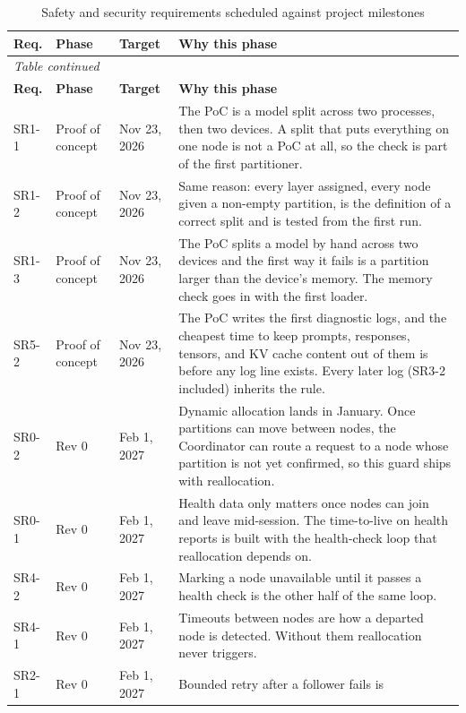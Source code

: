 \documentclass{article}
\begin{document}
\begin{longtable}{lp{2.1cm}p{1.9cm}>{\raggedright\arraybackslash}p{8.6cm}}
\caption{Safety and security requirements scheduled against project milestones}
\label{TblRoadmap}\\
\toprule
\textbf{Req.} & \textbf{Phase} & \textbf{Target} & \textbf{Why this phase}\\
\midrule
\endfirsthead
\multicolumn{4}{l}{\small\textit{Table \thetable{} continued}}\\
\toprule
\textbf{Req.} & \textbf{Phase} & \textbf{Target} & \textbf{Why this phase}\\
\midrule
\endhead
SR1-1 & Proof of concept & Nov 23, 2026 & The PoC is a model split across two
  processes, then two devices. A split that puts everything on one node is
  not a PoC at all, so the check is part of the first partitioner.\\
SR1-2 & Proof of concept & Nov 23, 2026 & Same reason: every layer assigned,
  every node given a non-empty partition, is the definition of a correct
  split and is tested from the first run.\\
SR1-3 & Proof of concept & Nov 23, 2026 & The PoC splits a model by hand
  across two devices and the first way it fails is a partition larger than the
  device's memory. The memory check goes in with the first loader.\\
SR5-2 & Proof of concept & Nov 23, 2026 & The PoC writes the first
  diagnostic logs, and the cheapest time to keep prompts, responses,
  tensors, and KV cache content out of them is before any log line exists.
  Every later log (SR3-2 included) inherits the rule.\\
\midrule
SR0-2 & Rev 0 & Feb 1, 2027 & Dynamic allocation lands in January.
  Once partitions can move between nodes, the
  Coordinator can route a request to a node whose partition is not yet
  confirmed, so this guard ships with
  reallocation.\\
SR0-1 & Rev 0 & Feb 1, 2027 & Health data only matters once nodes can
  join and leave mid-session. The time-to-live on health reports is built
  with the health-check loop that reallocation depends on.\\
SR4-2 & Rev 0 & Feb 1, 2027 & Marking a node unavailable until it
  passes a health check is the other half of the same loop.\\
SR4-1 & Rev 0 & Feb 1, 2027 & Timeouts between nodes are how a
  departed node is detected. Without them reallocation never triggers.\\
SR2-1 & Rev 0 & Feb 1, 2027 & Bounded retry after a follower fails is

\end{longtable}
\end{document}
